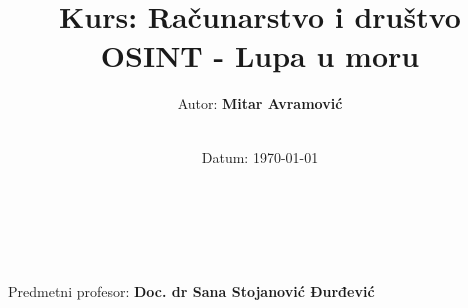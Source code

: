 \title{\Large Kurs: Računarstvo i društvo  \\[0.5cm]
        \bf\Large OSINT - Lupa u moru}
\author{\large Autor: \bf Mitar Avramović\\ \ \\}
\date{\large Datum: \today}

\makeatletter
    \begin{titlepage}
        \begin{center}
	    {\ \\ \ \\}
        \vbox{}\vspace{5cm}
            {\@title }\\[3cm] 
            {\@author}
            {\large Predmetni profesor: \bf Doc. dr Sana Stojanović Đurđević\\  \ \\}
            {\@date\\}

        \end{center}
    \end{titlepage}
\makeatother
